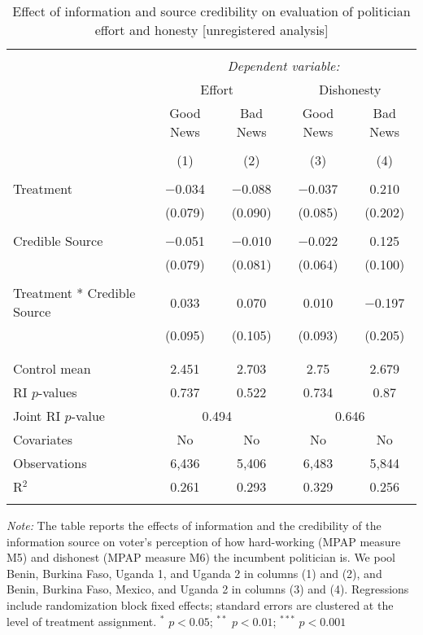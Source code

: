 
\begin{table}[!htbp] \centering 
  \caption{Effect of information and source credibility on evaluation of politician effort and honesty [unregistered analysis]} 
  \label{effort_honesty_credibility} 
\begin{tabular}{@{\extracolsep{1pt}}lcccc} 
\\[-1.8ex]\hline 
\hline \\[-1.8ex] 
 & \multicolumn{4}{c}{\textit{Dependent variable:}} \\ 
\cline{2-5} 
& \multicolumn{2}{c}{Effort}&\multicolumn{2}{c}{Dishonesty}\\
\cline{2-5}
 & Good News & Bad News & Good News & Bad News \\ 
\\[-1.8ex] & (1) & (2) & (3) & (4)\\ 
\hline \\[-1.8ex] 
 Treatment & $-$0.034 & $-$0.088 & $-$0.037 & 0.210 \\ 
  & (0.079) & (0.090) & (0.085) & (0.202) \\ 
  & & & & \\ 
 Credible Source & $-$0.051 & $-$0.010 & $-$0.022 & 0.125 \\ 
  & (0.079) & (0.081) & (0.064) & (0.100) \\ 
  & & & & \\ 
 Treatment * Credible Source & 0.033 & 0.070 & 0.010 & $-$0.197 \\ 
  & (0.095) & (0.105) & (0.093) & (0.205) \\ 
  & & & & \\ 
\hline \\[-1.8ex] 
Control mean & 2.451 & 2.703 & 2.75 & 2.679 \\ 
RI $p$-values & 0.737 & 0.522 & 0.734 & 0.87 \\ 
Joint RI $p$-value & \multicolumn{2}{c}{0.494} & \multicolumn{2}{c}{0.646} \\
Covariates & No & No & No & No \\ 
Observations & 6,436 & 5,406 & 6,483 & 5,844 \\ 
R$^{2}$ & 0.261 & 0.293 & 0.329 & 0.256 \\ 
\hline 
\hline \\[-1.8ex] 
\end{tabular} 
\begin{flushleft}\textit{Note:} The table reports the effects of information and the credibility of the information source on voter's perception of how hard-working (MPAP measure M5) and dishonest (MPAP measure M6) the incumbent politician is. We pool Benin, Burkina Faso, Uganda 1, and Uganda 2 in columns (1) and (2), and Benin, Burkina Faso, Mexico, and Uganda 2 in columns (3) and (4). Regressions include randomization block fixed effects; standard errors are clustered at the level of treatment assignment. $^*$ $p<0.05$; $^{**}$ $p<0.01$; $^{***}$ $p<0.001$ \end{flushleft}
\end{table} 
